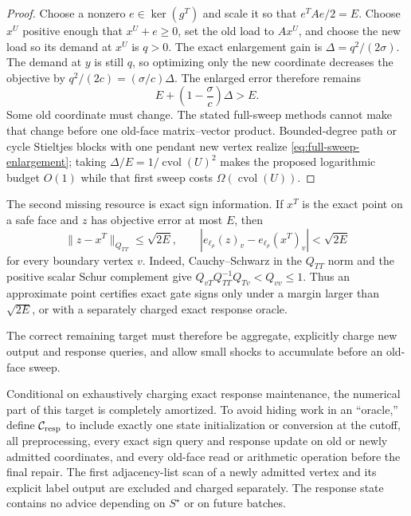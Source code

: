 \begin{proof}
Choose a nonzero $e\in\ker(g^T)$ and scale it so that
$e^TAe/2=E$.  Choose $x^U$ positive enough that $x^U+e\geq0$, set the old
load to $Ax^U$, and choose the new load so its demand at $x^U$ is $q>0$.
The exact enlargement gain is $\Delta=q^2/(2\sigma)$.  The demand at $y$ is
still $q$, so optimizing only the new coordinate decreases the objective by
$q^2/(2c)=(\sigma/c)\Delta$.  The enlarged error therefore remains
\begin{equation}
 E+\left(1-\frac\sigma c\right)\Delta>E.
 \label{eq:full-sweep-residual-error}
\end{equation}
Some old coordinate must change.  The stated full-sweep methods cannot make
that change before one old-face matrix--vector product.  Bounded-degree path
or cycle Stieltjes blocks with one pendant new vertex realize
\cref{eq:full-sweep-enlargement}; taking
$\Delta/E=1/\operatorname{cvol}(U)^2$ makes the proposed logarithmic budget
$O(1)$ while that first sweep costs $\Omega(\operatorname{cvol}(U))$.
\end{proof}

The second missing resource is exact sign information.  If $x^T$ is the
exact point on a safe face and $z$ has objective error at most $E$, then
\begin{equation}
 \|z-x^T\|_{Q_{TT}}\leq\sqrt{2E},
 \qquad
 |e_{\ell_\rho}(z)_v-e_{\ell_\rho}(x^T)_v|<\sqrt{2E}
 \label{eq:gate-margin-from-error}
\end{equation}
for every boundary vertex $v$.  Indeed, Cauchy--Schwarz in the $Q_{TT}$ norm
and the positive scalar Schur complement give
$Q_{vT}Q_{TT}^{-1}Q_{Tv}<Q_{vv}\leq1$.  Thus an approximate point certifies
exact gate signs only under a margin larger than $\sqrt{2E}$, or with a
separately charged exact response oracle.

The correct remaining target must therefore be aggregate, explicitly charge
new output and response queries, and allow small shocks to accumulate before
an old-face sweep.

Conditional on exhaustively charging exact response maintenance, the
numerical part of this target is completely amortized.  To avoid hiding work
in an ``oracle,'' define $\mathcal C_{\rm resp}$ to include exactly one state
initialization or conversion at the cutoff, all preprocessing, every exact
sign query and response update on old or newly admitted coordinates, and
every old-face read or arithmetic operation before the final repair.  The
first adjacency-list scan of a newly admitted vertex and its explicit label
output are excluded and charged separately.  The response state contains no
advice depending on $S^\star$ or on future batches.


